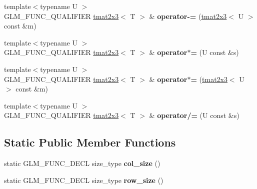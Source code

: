 \begin{DoxyCompactItemize}
\item 
\hypertarget{structglm_1_1detail_1_1tmat2x3_a4852d2c3699db52c0c80622ca6790abc}{{\footnotesize template$<$typename U $>$ }\\G\-L\-M\-\_\-\-F\-U\-N\-C\-\_\-\-Q\-U\-A\-L\-I\-F\-I\-E\-R \hyperlink{structglm_1_1detail_1_1tmat2x3}{tmat2x3}$<$ T $>$ \& {\bfseries operator-\/=} (\hyperlink{structglm_1_1detail_1_1tmat2x3}{tmat2x3}$<$ U $>$ const \&m)}\label{structglm_1_1detail_1_1tmat2x3_a4852d2c3699db52c0c80622ca6790abc}

\item 
\hypertarget{structglm_1_1detail_1_1tmat2x3_a6d0e3f109431cdb6d45b3d3c9ec5bd5d}{{\footnotesize template$<$typename U $>$ }\\G\-L\-M\-\_\-\-F\-U\-N\-C\-\_\-\-Q\-U\-A\-L\-I\-F\-I\-E\-R \hyperlink{structglm_1_1detail_1_1tmat2x3}{tmat2x3}$<$ T $>$ \& {\bfseries operator$\ast$=} (U const \&s)}\label{structglm_1_1detail_1_1tmat2x3_a6d0e3f109431cdb6d45b3d3c9ec5bd5d}

\item 
\hypertarget{structglm_1_1detail_1_1tmat2x3_a85f63be2f5516f0977c83e230fbb5895}{{\footnotesize template$<$typename U $>$ }\\G\-L\-M\-\_\-\-F\-U\-N\-C\-\_\-\-Q\-U\-A\-L\-I\-F\-I\-E\-R \hyperlink{structglm_1_1detail_1_1tmat2x3}{tmat2x3}$<$ T $>$ \& {\bfseries operator$\ast$=} (\hyperlink{structglm_1_1detail_1_1tmat2x3}{tmat2x3}$<$ U $>$ const \&m)}\label{structglm_1_1detail_1_1tmat2x3_a85f63be2f5516f0977c83e230fbb5895}

\item 
\hypertarget{structglm_1_1detail_1_1tmat2x3_af91dfb8d25e34223b0501064731fba2e}{{\footnotesize template$<$typename U $>$ }\\G\-L\-M\-\_\-\-F\-U\-N\-C\-\_\-\-Q\-U\-A\-L\-I\-F\-I\-E\-R \hyperlink{structglm_1_1detail_1_1tmat2x3}{tmat2x3}$<$ T $>$ \& {\bfseries operator/=} (U const \&s)}\label{structglm_1_1detail_1_1tmat2x3_af91dfb8d25e34223b0501064731fba2e}

\end{DoxyCompactItemize}
\subsection*{Static Public Member Functions}
\begin{DoxyCompactItemize}
\item 
\hypertarget{structglm_1_1detail_1_1tmat2x3_a3f255a0208ab82afbc4276085a77fd2b}{static G\-L\-M\-\_\-\-F\-U\-N\-C\-\_\-\-D\-E\-C\-L size\-\_\-type {\bfseries col\-\_\-size} ()}\label{structglm_1_1detail_1_1tmat2x3_a3f255a0208ab82afbc4276085a77fd2b}

\item 
\hypertarget{structglm_1_1detail_1_1tmat2x3_ae17c25ed3c1da3eebed1416789601e95}{static G\-L\-M\-\_\-\-F\-U\-N\-C\-\_\-\-D\-E\-C\-L size\-\_\-type {\bfseries row\-\_\-size} ()}\label{structglm_1_1detail_1_1tmat2x3_ae17c25ed3c1da3eebed1416789601e95}

\end{DoxyCompactItemize}


